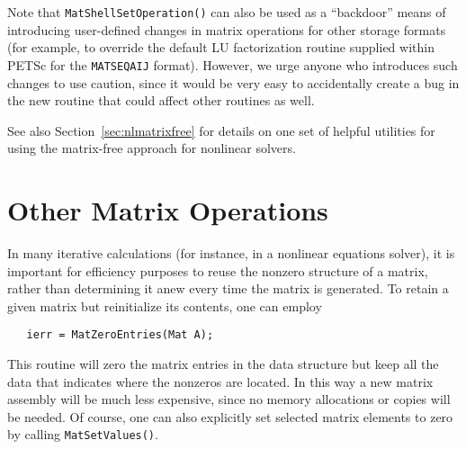 Note that {\tt MatShellSetOperation()} can also be used as a
``backdoor'' means of introducing user-defined changes in matrix
operations for other storage formats (for example, to override the
default LU factorization routine supplied within PETSc for the
{\tt MATSEQAIJ} format).  However, we urge anyone who introduces such
changes to use caution, since it would be very easy to
accidentally create a bug in the new routine that could affect
other routines as well.

See also Section~\ref{sec:nlmatrixfree} for details on one set of
helpful utilities for using the matrix-free approach for nonlinear
solvers.

\section{Other Matrix Operations}
\label{sec:othermat}

In many iterative calculations (for instance, in a nonlinear equations
solver), it is important for efficiency purposes to reuse the nonzero 
structure of a matrix, rather than determining it anew every time 
the matrix is generated.  To retain a given matrix but reinitialize
its contents, one can employ 
\begin{verbatim}
   ierr = MatZeroEntries(Mat A);
\end{verbatim}
This routine will zero the matrix entries in the 
data structure but keep all the data that indicates where the nonzeros
are located.  In this way a new matrix assembly will be much less 
expensive, since no memory allocations or copies will be needed. 
Of course, one can also explicitly set selected matrix elements to zero
by calling {\tt MatSetValues()}.


